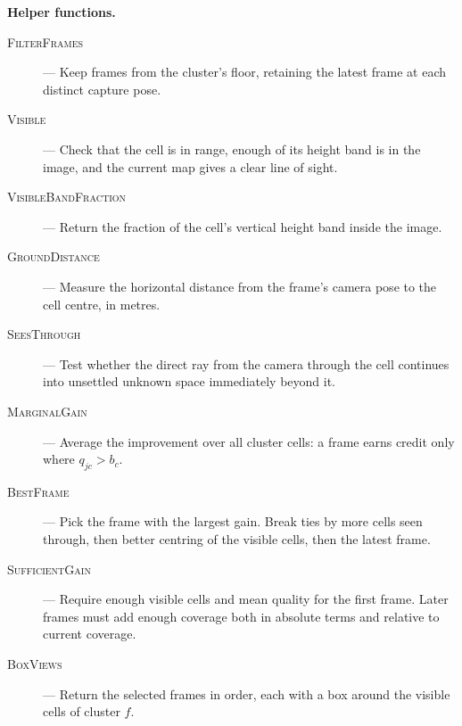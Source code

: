 \documentclass{article}
\begin{document}
\noindent\textbf{Helper functions.}
\begin{description}
\item[\textsc{FilterFrames}] --- Keep frames from the cluster's floor, retaining the latest frame at each distinct capture pose.
\item[\textsc{Visible}] --- Check that the cell is in range, enough of its height band is in the image, and the current map gives a clear line of sight.
\item[\textsc{VisibleBandFraction}] --- Return the fraction of the cell's vertical height band inside the image.
\item[\textsc{GroundDistance}] --- Measure the horizontal distance from the frame's camera pose to the cell centre, in metres.
\item[\textsc{SeesThrough}] --- Test whether the direct ray from the camera through the cell continues into unsettled unknown space immediately beyond it.
\item[\textsc{MarginalGain}] --- Average the improvement over all cluster cells: a frame earns credit only where $q_{jc}>b_c$.
\item[\textsc{BestFrame}] --- Pick the frame with the largest gain. Break ties by more cells seen through, then better centring of the visible cells, then the latest frame.
\item[\textsc{SufficientGain}] --- Require enough visible cells and mean quality for the first frame. Later frames must add enough coverage both in absolute terms and relative to current coverage.
\item[\textsc{BoxViews}] --- Return the selected frames in order, each with a box around the visible cells of cluster $f$.
\end{description}
\end{document}

